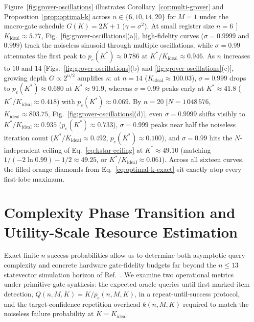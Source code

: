 Figure~\ref{fig:grover-oscillations} illustrates Corollary~\ref{cor:multi-grover} and Proposition~\ref{prop:optimal-k} across $n \in \{6, 10, 14, 20\}$ for $M = 1$ under the macro-gate schedule $G(K) = 2K + 1$ ($\gamma = \sigma^2$). At small register size $n = 6$ [$K_{\mathrm{ideal}} \approx 5.77$, Fig.~\ref{fig:grover-oscillations}(a)], high-fidelity curves ($\sigma = 0.9999$ and $0.999$) track the noiseless sinusoid through multiple oscillations, while $\sigma = 0.99$ attenuates the first peak to $p_e(K^*) \approx 0.786$ at $K^*/K_{\mathrm{ideal}} \approx 0.946$. As $n$ increases to $10$ and $14$ [Figs.~\ref{fig:grover-oscillations}(b) and \ref{fig:grover-oscillations}(c)], growing depth $G \propto 2^{n/2}$ amplifies $\kappa$: at $n = 14$ ($K_{\mathrm{ideal}} \approx 100.03$), $\sigma = 0.999$ drops to $p_e(K^*) \approx 0.680$ at $K^* \approx 91.9$, whereas $\sigma = 0.99$ peaks early at $K^* \approx 41.8$ ($K^*/K_{\mathrm{ideal}} \approx 0.418$) with $p_e(K^*) \approx 0.069$. By $n = 20$ [$N = 1\,048\,576$, $K_{\mathrm{ideal}} \approx 803.75$, Fig.~\ref{fig:grover-oscillations}(d)], even $\sigma = 0.9999$ shifts visibly to $K^*/K_{\mathrm{ideal}} \approx 0.935$ ($p_e(K^*) \approx 0.733$), $\sigma = 0.999$ peaks near half the noiseless iteration count ($K^*/K_{\mathrm{ideal}} \approx 0.492$, $p_e(K^*) \approx 0.100$), and $\sigma = 0.99$ hits the $N$-independent ceiling of Eq.~\eqref{eq:kstar-ceiling} at $K^* \approx 49.10$ (matching $1/(-2\ln 0.99) - 1/2 \approx 49.25$, or $K^*/K_{\mathrm{ideal}} \approx 0.061$). Across all sixteen curves, the filled orange diamonds from Eq.~\eqref{eq:optimal-k-exact} sit exactly atop every first-lobe maximum.

\section{Complexity Phase Transition and Utility-Scale Resource Estimation}
\label{sec:complexity-resources}

Exact finite-$n$ success probabilities allow us to determine both asymptotic query complexity and concrete hardware gate-fidelity budgets far beyond the $n \le 13$ statevector simulation horizon of Ref.~\cite{SahaRoyLacalle2026}. We examine two operational metrics under primitive-gate synthesis: the expected oracle queries until first marked-item detection, $Q(n, M, K) = K / p_e(n, M, K)$, in a repeat-until-success protocol, and the target-confidence repetition overhead $k(n, M, K)$ required to match the noiseless failure probability at $K = K_{\mathrm{ideal}}$.

